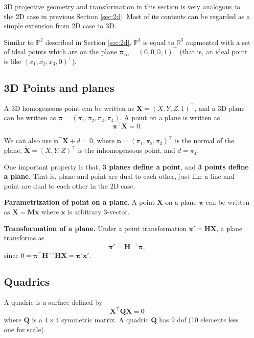 \documentclass[12pt]{article}
\numberwithin{equation}{section}
\begin{document}
3D projective geometry and transformation in this section is very analogous to the 2D case in previous Section \ref{sec:2d}. Most of its contents can be regarded as a simple extension from 2D case to 3D.

Similar to $\mathbb{P}^2$ described in Section \ref{sec:2d}, $\mathbb{P}^3$ is equal to $\mathbb{R}^3$ augmented with a set of ideal points which are on the plane $\bm{\pi}_{\infty} = (0, 0, 0, 1)^\top$ (that is, an ideal point is like $(x_1, x_2, x_3, 0)^\top$).


\subsection{3D Points and planes}

A 3D homogeneous point can be written as $\mathbf{X} = (X, Y, Z, 1)^\top$, and a 3D plane can be written as $\bm{\pi} = (\pi_1, \pi_2, \pi_3, \pi_4)$. A point on a plane is written as
\begin{equation}
\bm{\pi}^\top \mathbf{X} = 0.
\end{equation}

We can also use $\mathbf{n^\top \widetilde{X}} + d = 0$, where $\mathbf{n} = (\pi_1, \pi_2, \pi_3)^\top$ is the normal of the plane, $\widetilde{\mathbf{X}} = (X, Y, Z)^\top$ is the inhomogeneous point, and $d = \pi_4$. 

One important property is that, \textbf{3 planes define a point}, and \textbf{3 points define a plane}. That is, plane and point are dual to each other, just like a line and point are dual to each other in the 2D case.

\textbf{Parametrization of point on a plane}. A point $\mathbf{X}$ on a plane $\bm{\pi}$ can be written as $\mathbf{X = Mx}$ where $\mathbf{x}$ is arbitrary 3-vector.

\textbf{Transformation of a plane.} Under a point transformation $\mathbf{x' = HX}$, a plane transforms as 
\begin{equation}
\bm{\pi}' =  \mathbf{H}^{-\top}\bm{\pi},
\end{equation}
since $0 = \bm{\pi}^\top \mathbf{H}^{-1} \mathbf{HX} = \bm{\pi}'\mathbf{x}'$.

\subsection{Quadrics}

A quadric is a surface defined by
\begin{equation}
\mathbf{X^\top Q X} = 0
\label{eq:quadric}
\end{equation}
where $\mathbf{Q}$ is a $4 \times 4$ symmetric matrix. A quadric $\mathbf{Q}$ has 9 dof (10 elements less one for scale).
\end{document}
